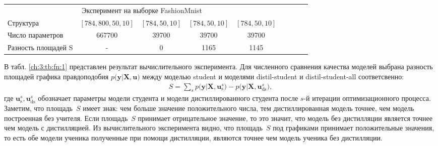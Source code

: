 \begin{table}[]
\begin{center}
{\begin{tabular}{|l|c|c|c|c|llll}
\multicolumn{5}{|c|}{Эксперимент на выборке FashionMnist}                                                     &                      &                      &                      &                      \\ \cline{1-5}
Структура           & $[784,800,50,10]$& $[784,50,10]$   & $[784,50,10]$  & $[784,50,10]$      &                      &                      &                      &                      \\ \cline{1-5}
Число параметров    &           667700                  &          39700                &         39700                &                 39700            &                      &                      &                      &                      \\ \cline{1-5}
Разность площадей S   & -                           & 0                       &  1165               & 1145                    &                      &                      &                      &                      \\ \cline{1-5}
\end{tabular}
}
\end{center}
\end{table}

В табл. \ref{ch:3:tb:fn:1} представлен результат вычислительного эксперимента. Для численного сравнения качества моделей выбрана разность площадей графика правдоподобия $p\bigr(\mathbf{y}|\mathbf{X}, \mathbf{u}\bigr)$ между моделью student и моделями distil-student  и 
distil-student-all соответсвенно:
\[
\label{ch:3:eq:ex:8}
\begin{aligned}
S = \sum_{s} p\bigr(\mathbf{y}|\mathbf{X}, \mathbf{u}^s_{\text{s}}\bigr) - p\bigr(\mathbf{y}|\mathbf{X}, \mathbf{u}^s_{\text{ds}}\bigr),
\end{aligned}
\]
где $\mathbf{u}^s_{\text{s}}, \mathbf{u}^s_{\text{ds}}$ обозначает параметры модели студента и модели дистиллированного студента после $s$-й итерации оптимизационного процесса. Заметим, что площадь~$S$ имеет знак: чем больше значение положительного числа, тем дистиллированная модель точнее, чем модель построенная без учителя. Если площадь~$S$ принимает отрицательное значение, то это значит, что модель без дистилляции является точнее чем модель с дистилляцией. Из вычислительного эксперимента видно, что площадь~$S$ под графиками принимает положительные значения, то есть обе модели ученика полученные при помощи дистилляции, являются точнее чем модель ученика без дистилляции.